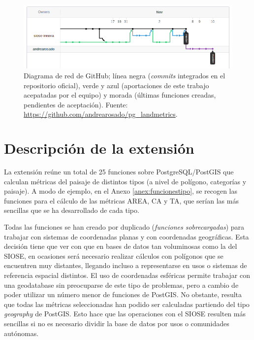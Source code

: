 \begin{figure}
\begin{center}
\includegraphics[width=\textwidth]{ResultadosyDiscusion/Figs/network.png}
\caption{Diagrama de red de GitHub; línea negra (\textit{commits} integrados en el repositorio oficial), verde y azul (aportaciones de este trabajo acepatadas por el equipo) y morada (últimas funciones creadas, pendientes de aceptación). Fuente: \url{https://github.com/andrearosado/pg_landmetrics}. \label{fig:network}}
\end{center}
\end{figure}

\section{Descripción de la extensión \pgland{} \label{sec:extension}}

La extensión \pgland{} reúne  un total de 25 funciones sobre PostgreSQL/PostGIS que calculan métricas del paisaje de distintos tipos (a nivel de polígono, categorías y paisaje). A modo de ejemplo, en el Anexo \ref{anex:funcionestipo}, se recogen las funciones para el cálculo de las métricas AREA, CA y TA, que serían las más sencillas que se ha desarrollado de cada tipo. 

Todas las funciones se han creado por duplicado (\textit{funciones sobrecargadas}) para trabajar con sistemas de coordenadas planas y con coordenadas geográficas. Esta decisión tiene que ver con que en bases de datos tan voluminosas como la del SIOSE, en ocasiones será necesario realizar cálculos con polígonos que se encuentren muy distantes, llegando incluso a representarse en usos o sistemas de referencia espacial distintos. El uso de coordenadas esféricas permite trabajar con una geodatabase sin preocuparse de este tipo de problemas, pero a cambio de poder utilizar un número menor de funciones de PostGIS. No obstante, resulta que todas las métricas seleccionadas han podido ser calculadas partiendo del tipo \textit{geography} de PostGIS. Esto hace que las operaciones con el SIOSE resulten más sencillas si no es necesario dividir la base de datos por usos o comunidades autónomas.

